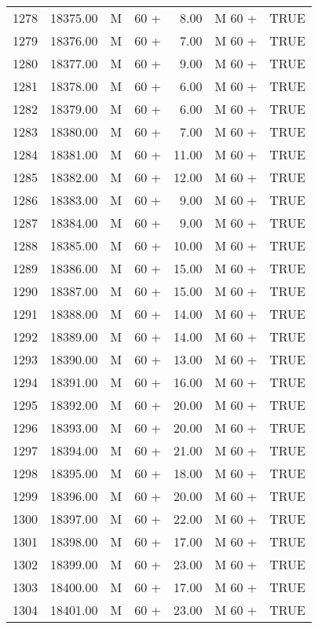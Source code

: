 \begin{table}[ht]
\begin{tabular}{rrllrll}
  1278 & 18375.00 & M & 60 + & 8.00 & M 60 + & TRUE \\ 
  1279 & 18376.00 & M & 60 + & 7.00 & M 60 + & TRUE \\ 
  1280 & 18377.00 & M & 60 + & 9.00 & M 60 + & TRUE \\ 
  1281 & 18378.00 & M & 60 + & 6.00 & M 60 + & TRUE \\ 
  1282 & 18379.00 & M & 60 + & 6.00 & M 60 + & TRUE \\ 
  1283 & 18380.00 & M & 60 + & 7.00 & M 60 + & TRUE \\ 
  1284 & 18381.00 & M & 60 + & 11.00 & M 60 + & TRUE \\ 
  1285 & 18382.00 & M & 60 + & 12.00 & M 60 + & TRUE \\ 
  1286 & 18383.00 & M & 60 + & 9.00 & M 60 + & TRUE \\ 
  1287 & 18384.00 & M & 60 + & 9.00 & M 60 + & TRUE \\ 
  1288 & 18385.00 & M & 60 + & 10.00 & M 60 + & TRUE \\ 
  1289 & 18386.00 & M & 60 + & 15.00 & M 60 + & TRUE \\ 
  1290 & 18387.00 & M & 60 + & 15.00 & M 60 + & TRUE \\ 
  1291 & 18388.00 & M & 60 + & 14.00 & M 60 + & TRUE \\ 
  1292 & 18389.00 & M & 60 + & 14.00 & M 60 + & TRUE \\ 
  1293 & 18390.00 & M & 60 + & 13.00 & M 60 + & TRUE \\ 
  1294 & 18391.00 & M & 60 + & 16.00 & M 60 + & TRUE \\ 
  1295 & 18392.00 & M & 60 + & 20.00 & M 60 + & TRUE \\ 
  1296 & 18393.00 & M & 60 + & 20.00 & M 60 + & TRUE \\ 
  1297 & 18394.00 & M & 60 + & 21.00 & M 60 + & TRUE \\ 
  1298 & 18395.00 & M & 60 + & 18.00 & M 60 + & TRUE \\ 
  1299 & 18396.00 & M & 60 + & 20.00 & M 60 + & TRUE \\ 
  1300 & 18397.00 & M & 60 + & 22.00 & M 60 + & TRUE \\ 
  1301 & 18398.00 & M & 60 + & 17.00 & M 60 + & TRUE \\ 
  1302 & 18399.00 & M & 60 + & 23.00 & M 60 + & TRUE \\ 
  1303 & 18400.00 & M & 60 + & 17.00 & M 60 + & TRUE \\ 
  1304 & 18401.00 & M & 60 + & 23.00 & M 60 + & TRUE \\ 

\end{tabular}
\end{table}
